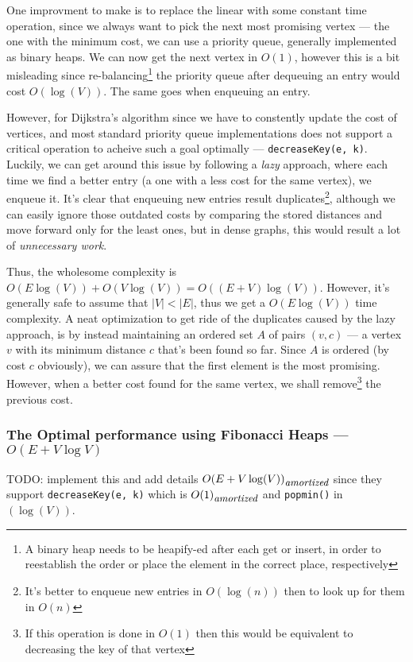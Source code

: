 \documentclass[12pt]{article}
\begin{document}


 One improvment to make is to replace the linear with some constant time operation, since we always want to pick the next most promising vertex --- the one with the minimum cost, we can use a priority queue, generally implemented as binary heaps. We can now get the next vertex in $O(1)$, however this is a bit misleading since re-balancing\footnote{A binary heap needs to be heapify-ed after each get or insert, in order to reestablish the order or place the element in the correct place, respectively} the priority queue after dequeuing an entry would cost $O(\log(V))$. The same goes when enqueuing an entry.

However, for Dijkstra's algorithm since we have to constently update the cost of vertices, and most standard priority queue implementations does not support a critical operation to acheive such a goal optimally --- \texttt{decreaseKey(e, k)}. Luckily, we can get around this issue by following a \textit{lazy} approach, where each time we find a better entry (a one with a less cost for the same vertex), we enqueue it. It's clear that enqueuing new entries result duplicates\footnote{It's better to enqueue new entries in $O(\log(n))$ then to look up for them in $O(n)$}, although we can easily ignore those outdated costs by comparing the stored distances and move forward only for the least ones, but in dense graphs, this would result a lot of \textit{unnecessary work}.

Thus, the wholesome complexity is $O(E\log(V)) + O(V\log(V)) = O((E + V)\log(V))$. However, it's generally safe to assume that $|V| < |E|$, thus we get a $O(E\log(V))$ time complexity. A neat optimization to get ride of the duplicates caused by the lazy approach, is by instead maintaining an ordered set $A$ of pairs $(v, c)$ --- a vertex $v$ with its minimum distance $c$ that's been found so far. Since $A$ is ordered (by cost $c$ obviously), we can assure that the first element is the most promising. However, when a better cost found for the same vertex, we shall remove\footnote{If this operation is done in $O(1)$ then this would be equivalent to decreasing the key of that vertex} the previous cost.

\subsubsection{The Optimal performance using Fibonacci Heaps --- $O(E + V\log{V})$}

TODO: implement this and add details $O{(E + V\log(V))}_{\textit{\small amortized}}$ since they support \texttt{decreaseKey(e, k)} which is $O{(1)}_{\textit{\small amortized}}$ and \texttt{popmin()} in $(\log(V))$.
\end{document}
